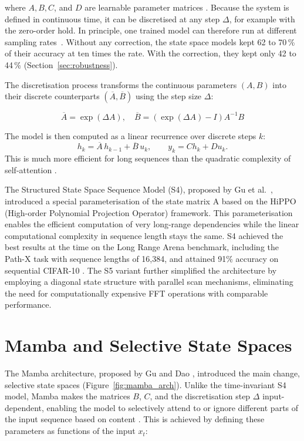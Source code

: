 \documentclass[11pt, a4paper]{report}
\begin{document}
where $A, B, C$, and $D$ are learnable parameter matrices \cite{gu2022efficiently}. Because the system is defined in continuous time, it can be discretised at any step $\Delta$, for
example with the zero-order hold. In principle, one trained model can therefore run at different sampling
rates~\cite{gu2022efficiently, zubic2024state}. Without any correction, the state space models kept 62 to 70\,\% of their accuracy at ten times the rate. With the
correction, they kept only 42 to 44\,\% (Section~\ref{sec:robustness}).

The discretisation process transforms the continuous parameters $(A, B)$ into their discrete counterparts $(\overline{A}, \overline{B})$ using the step size $\Delta$:

\begin{equation}
    \overline{A} = \exp(\Delta A), \quad \overline{B} = (\exp(\Delta A) - I)A^{-1}B
\end{equation}

The model is then computed as a linear recurrence over discrete steps $k$:
\begin{equation}
    h_k = \overline{A}\, h_{k-1} + \overline{B}\, u_k, \qquad y_k = C h_k + D u_k .
    \label{eq:ssm_discrete}
\end{equation}
This is much more efficient for long sequences than the quadratic complexity of self-attention \cite{gu2023mamba, somvanshi2025from}.

The Structured State Space Sequence Model (S4), proposed by Gu et al.~\cite{gu2022efficiently}, introduced a special parameterisation of the state matrix A based on the HiPPO (High-order Polynomial Projection Operator) framework. This parameterisation enables the efficient computation of very long-range dependencies while the linear computational complexity in sequence length stays the same. S4 achieved the best results at the time on the Long Range Arena benchmark, including the Path-X task with sequence lengths of 16,384, and attained 91\% accuracy on sequential CIFAR-10 \cite{gu2022efficiently}. The S5 variant \cite{smith2023simplified} further simplified the architecture by employing a diagonal state structure with parallel scan mechanisms, eliminating the need for computationally expensive FFT operations with comparable performance.

\section{Mamba and Selective State Spaces}
The Mamba architecture, proposed by Gu and Dao \cite{gu2023mamba}, introduced the main change, selective state spaces (Figure~\ref{fig:mamba_arch}). Unlike the time-invariant S4 model, Mamba makes the matrices $B$, $C$, and the discretisation step $\Delta$ input-dependent, enabling the model to selectively attend to or ignore different parts of the input sequence based on content \cite{gu2023mamba}. This is achieved by defining these parameters as functions of the input $x_t$:
\end{document}
